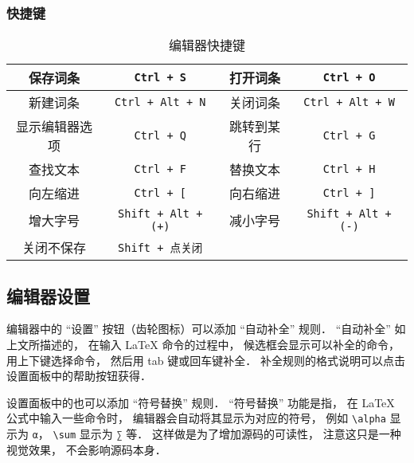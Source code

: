 \subsubsection{快捷键}

\begin{table}[ht]
\centering
\caption{编辑器快捷键}\label{editor_tab1}
\begin{tabular}{|c|c|c|c|}
\hline
保存词条 & \verb|Ctrl + S| & 打开词条 & \verb|Ctrl + O| \\
\hline
新建词条 & \verb|Ctrl + Alt + N| & 关闭词条 & \verb|Ctrl + Alt + W| \\
\hline
显示编辑器选项 & \verb|Ctrl + Q| & 跳转到某行 & \verb|Ctrl + G| \\
\hline
查找文本 & \verb|Ctrl + F| & 替换文本 & \verb|Ctrl + H| \\
\hline
向左缩进 & \verb|Ctrl + [| & 向右缩进 & \verb|Ctrl + ]| \\
\hline
增大字号 & \verb|Shift + Alt + (+)| & 减小字号 & \verb|Shift + Alt + (-)| \\
\hline
关闭不保存 & \verb|Shift + 点关闭| &  &  \\
\hline
\end{tabular}
\end{table}

\subsection{编辑器设置}
编辑器中的 “设置” 按钮（齿轮图标）可以添加 “自动补全” 规则． “自动补全” 如上文所描述的， 在输入 LaTeX 命令的过程中， 候选框会显示可以补全的命令， 用上下键选择命令， 然后用 tab 键或回车键补全． 补全规则的格式说明可以点击设置面板中的帮助按钮获得．

设置面板中的也可以添加 “符号替换” 规则． “符号替换” 功能是指， 在 LaTeX 公式中输入一些命令时， 编辑器会自动将其显示为对应的符号， 例如 \verb|\alpha| 显示为 \lstinline|α|， \verb|\sum| 显示为 \lstinline|∑| 等． 这样做是为了增加源码的可读性， 注意这只是一种视觉效果， 不会影响源码本身．
